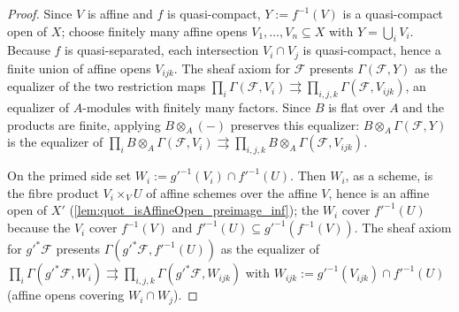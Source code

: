 \begin{proof}\leanok
  Since \(V\) is affine and \(f\) is quasi-compact, \(Y := f^{-1}(V)\) is a
  quasi-compact open of \(X\); choose finitely many affine opens
  \(V_1, \dots, V_n \subseteq X\) with \(Y = \bigcup_i V_i\). Because \(f\)
  is quasi-separated, each intersection \(V_i \cap V_j\) is quasi-compact,
  hence a finite union of affine opens \(V_{ijk}\). The sheaf axiom for
  \(\mathcal F\) presents \(\Gamma(\mathcal F, Y)\) as the equalizer of the
  two restriction maps
  \(\prod_i \Gamma(\mathcal F, V_i) \rightrightarrows
    \prod_{i,j,k} \Gamma(\mathcal F, V_{ijk})\),
  an equalizer of \(A\)-modules with finitely many factors. Since \(B\) is
  flat over \(A\) and the products are finite, applying
  \(B \otimes_A (-)\) preserves this equalizer:
  \(B \otimes_A \Gamma(\mathcal F, Y)\) is the equalizer of
  \(\prod_i B \otimes_A \Gamma(\mathcal F, V_i) \rightrightarrows
    \prod_{i,j,k} B \otimes_A \Gamma(\mathcal F, V_{ijk})\).

  On the primed side set \(W_i := g'^{-1}(V_i) \cap f'^{-1}(U)\). Then
  \(W_i\), as a scheme, is the fibre product \(V_i \times_V U\) of affine
  schemes over the affine \(V\), hence is an affine open of \(X'\)
  (\cref{lem:quot_isAffineOpen_preimage_inf}); the
  \(W_i\) cover \(f'^{-1}(U)\) because the \(V_i\) cover \(f^{-1}(V)\) and
  \(f'^{-1}(U) \subseteq g'^{-1}(f^{-1}(V))\). The sheaf axiom for
  \(g'^* \mathcal F\) presents \(\Gamma(g'^*\mathcal F, f'^{-1}(U))\) as the
  equalizer of
  \(\prod_i \Gamma(g'^*\mathcal F, W_i) \rightrightarrows
    \prod_{i,j,k} \Gamma(g'^*\mathcal F, W_{ijk})\)
  with \(W_{ijk} := g'^{-1}(V_{ijk}) \cap f'^{-1}(U)\) (affine opens
  covering \(W_i \cap W_j\)).


\end{proof}
